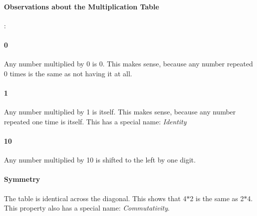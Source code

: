 \paragraph{Observations about the Multiplication Table}:
\linebreak
\paragraph{0} Any number multiplied by 0 is 0. This makes sense, because any number
repeated 0 times is the same as not having it at all.
\paragraph{1} Any number multiplied by 1 is itself. This makes sense, because any
number repeated one time is itself. This has a special name: \textit{Identity}
\paragraph{10} Any number multiplied by 10 is shifted to the left by one digit.
\paragraph{Symmetry} The table is identical across the diagonal. This shows
that 4$\ast$2 is the same as 2$\ast$4. This property also has a special name:
\textit{Commutativity}.
